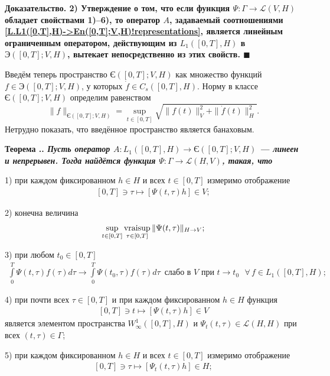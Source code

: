 \documentclass{report}
\newcounter{rem}[section]
\newcounter{theor}[section]
\renewcommand{\thetheor}{\thesection.\arabic{theor}}
\newenvironment{Theorem}{\par\refstepcounter{theor}\bf Теорема \thetheor. \it}{\rm\par}
\newenvironment{Proof}{\par\noindent\bf Доказательство.\rm}{ $\blacksquare$\par}
\newcommand{\vraisup}{\mathop{\rm vraisup}}
\begin{document}
\begin{Proof}
2) Утверждение о том, что если функция $\Psi:\Gamma\to\mathcal{L}(V,H)$ обладает свойствами 1)--6), то оператор $A$, задаваемый соотношениями
\eqref{L.L1([0,T],H)->En([0,T];V,H)!representations}, является линейным ограниченным оператором, действующим из $L_1([0,T],H)$ в $\textrm{Э}([0,T];V,H)$, вытекает непосредственно из
этих свойств.
\end{Proof}

Введём теперь пространство $\textrm{Є}([0,T];V,H)$ как множество функций $f\in \textrm{Э}([0,T];V,H)$, у которых $\dot{f}\in C_s([0,T],H)$. Норму в классе $\textrm{Є}([0,T];V,H)$
определим равенством
$$
\|f\|_{\textrm{Є}([0,T];V,H)}=\sup\limits_{t\in[0,T]}\sqrt{\|f(t)\|^2_V+\|\dot{f}(t)\|^2_H}.
$$
Нетрудно показать, что введённое пространство является банаховым.


\begin{Theorem}\label{L.L1([0,T],H)->En2([0,T];V,H)!theorem}
Пусть оператор $A:L_1([0,T],H)\to\textrm{Є}([0,T];V,H)$ --- линеен и непрерывен. Тогда найдётся функция $\Psi:\Gamma\to\mathcal{L}(H,V)$, такая, что

1) при каждом фиксированном $h\in H$ и всех $t\in[0,T]$ измеримо отображение
\begin{gather}\label{L.L1([0,T],H)->En2([0,T];V,H)!tau->Psi(t,tau)h}
[0,T]\ni\tau\mapsto[\Psi(t,\tau)h]\in V;
\end{gather}

2) конечна величина
\begin{gather}\label{L.L1([0,T],H)->En2([0,T];V,H)!vraisup.wrt.tau.of.norm(Psi(t,tau))}
\sup\limits_{t\in[0,T]}\vraisup\limits_{\tau\in[0,T]}\|\Psi(t,\tau)\|_{H\to V};
\end{gather}

3) при любом $t_0\in[0,T]$
\begin{gather}\label{L.L1([0,T],H)->En2([0,T];V,H)!weak.continuity.Psi}
\int\limits_0^T\Psi(t,\tau)f(\tau)d\tau\to\int\limits_0^T\Psi(t_0,\tau)f(\tau)d\tau\,\,\,\text{слабо в $V$ при $t\to t_0$ }\forall\,f\in L_1([0,T],H);
\end{gather}

4) при почти всех $\tau\in[0,T]$ и при каждом фиксированном $h\in H$ функция
\begin{gather}\label{L.L1([0,T],H)->En2([0,T];V,H)!t->Psi(t,tau)h}
[0,T]\ni t\mapsto[\Psi(t,\tau)h]\in V
\end{gather}
является элементом пространства $W^1_\infty([0,T],H)$ и $\Psi_t(t,\tau)\in\mathcal{L}(H,H)$ при всех $(t,\tau)\in\Gamma$;

5) при каждом фиксированном $h\in H$ и всех $t\in[0,T]$ измеримо отображение
\begin{gather}\label{L.L1([0,T],H)->En2([0,T];V,H)!tau->Psi.t(t,tau)h}
[0,T]\ni\tau\mapsto[\Psi_t(t,\tau)h]\in H;
\end{gather}


\end{Theorem}
\end{document}
